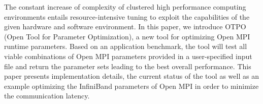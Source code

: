 The constant increase of complexity of clustered high performance computing environments entails resource-intensive tuning to exploit the capabilities of the given hardware and software environment. In this paper, we introduce OTPO (Open Tool for Parameter Optimization), a new tool for optimizing Open MPI runtime parameters. Based on an application benchmark, the tool will test all viable combinations of Open MPI parameters provided in a user-specified input file and return the parameter sets leading to the best overall performance. This paper presents implementation details, the current status of the tool as well as an example optimizing the InfiniBand parameters of Open MPI in order to minimize the communication latency.
